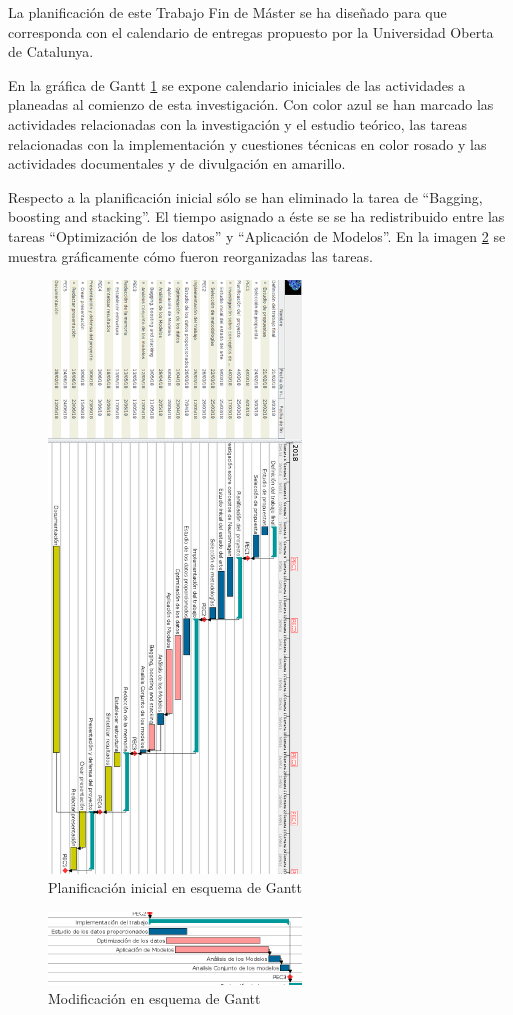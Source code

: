 La planificación de este Trabajo Fin de Máster se ha diseñado para que corresponda con el calendario de entregas propuesto por la Universidad Oberta de Catalunya.

En la gráfica de Gantt \ref{figure:gantt} se expone calendario iniciales de las actividades a planeadas al comienzo de esta investigación. Con color azul se han marcado las actividades relacionadas con la investigación y el estudio teórico, las tareas relacionadas con la implementación y cuestiones técnicas en color rosado y las actividades documentales y de divulgación en amarillo.

Respecto a la planificación inicial sólo se han eliminado la tarea de ``Bagging, boosting and stacking''. El tiempo asignado a éste se se ha redistribuido entre las tareas ``Optimización de los datos'' y ``Aplicación de Modelos''. En la imagen \ref{figure:ganttmod} se muestra gráficamente cómo fueron reorganizadas las tareas.

\begin{figure}[ht]
\centering
\includegraphics[width=0.6\textwidth]{figs/planificacion/gantt.png}
\caption{Planificación inicial en esquema de Gantt}
\label{figure:gantt}
\end{figure}

\begin{figure}[H]
\centering
\includegraphics[width=0.6\textwidth]{figs/planificacion/modificacion.png}
\caption{Modificación en esquema de Gantt}
\label{figure:ganttmod}
\end{figure}